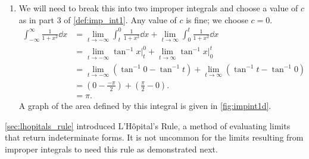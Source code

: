 \begin{example}
\begin{enumerate}
	\item	We will need to break this into two improper integrals and choose a value of $c$ as in part 3 of \autoref{def:imp_int1}. Any value of $c$ is fine; we choose $c=0$.
%
%
\begin{align*}
	\int_{-\infty}^\infty \frac1{1+x^2}\dd x
	&= \lim_{t\to-\infty} \int_t^0\frac{1}{1+x^2}\dd x + \lim_{t\to\infty} \int_0^t\frac{1}{1+x^2}\dd x \\
	&= \lim_{t\to-\infty} \tan^{-1}x\Big|_t^0 + \lim_{t\to\infty} \tan^{-1}x\Big|_0^t\\
	&= \lim_{t\to-\infty} \left(\tan^{-1}0-\tan^{-1}t\right) + \lim_{t\to\infty} \left(\tan^{-1}t-\tan^{-1}0\right)\\		
	&= \left(0-\frac{-\pi}2\right) + \left(\frac{\pi}2-0\right).\\
	&= \pi.
\end{align*}
A graph of the area defined by this integral is given in \autoref{fig:impint1d}.
\end{enumerate}
\end{example}

\autoref{sec:lhopitals_rule} introduced L'Hôpital's Rule, a method of evaluating limits that return indeterminate forms. It is not uncommon for the limits resulting from improper integrals to need this rule as demonstrated next.

